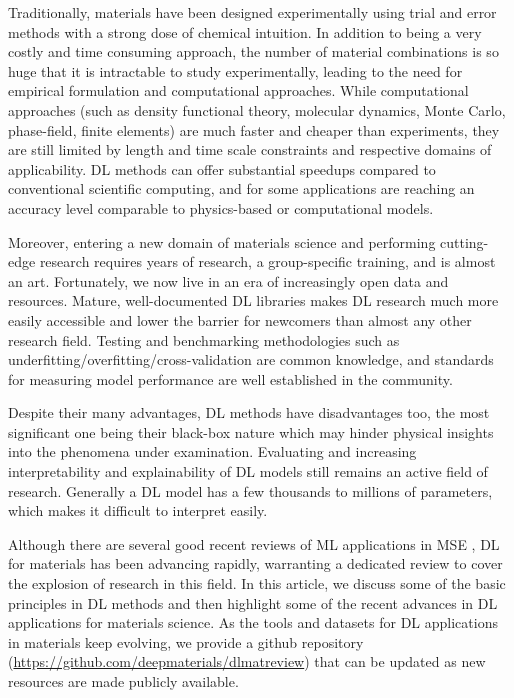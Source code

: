 \documentclass[pdflatex,sn-mathphys]{sn-jnl}%
\theoremstyle{thmstyleone}%
\theoremstyle{thmstyletwo}%
\theoremstyle{thmstylethree}%
\begin{document}
Traditionally, materials have been designed experimentally using trial and error methods with a strong dose of chemical intuition. In addition to being a very costly and time consuming approach, the number of material combinations is so huge that it is intractable to study experimentally, leading to the need for empirical formulation and computational approaches. While computational approaches (such as density functional theory, molecular dynamics, Monte Carlo, phase-field,  finite elements) are much faster and cheaper than experiments, they are still limited by length and time scale constraints and respective domains of applicability. DL methods can offer substantial speedups compared to conventional scientific computing, and for some applications are reaching an accuracy level comparable to physics-based or computational models.

Moreover, entering a new domain of materials science and performing cutting-edge research requires years of research, a group-specific training, and is almost an art. Fortunately, we now live in an era of increasingly open data and resources. Mature, well-documented DL libraries makes DL research much more easily accessible and lower the barrier for newcomers than almost any other research field. Testing and benchmarking methodologies such as underfitting/overfitting/cross-validation \cite{vasudevan2019materials,schmidt2019recent,artrith2021best} are common knowledge, and standards for measuring model performance are well established in the community.
 
Despite their many advantages, DL methods have disadvantages too, the most significant one being their black-box nature which may hinder physical insights into the phenomena under examination. Evaluating and increasing  interpretability and explainability of DL models still remains an active field of research. Generally a DL model has a few thousands to millions of parameters, which makes it difficult to interpret easily.

Although there are several good recent reviews of ML applications in MSE \cite{vasudevan2019materials,schleder2019dft,schmidt2019recent,mueller2016machine,wei2019machine,butler2018machine,liu2020machine,wang2020machine,morgan2020opportunities,himanen2019data,rajan2013informatics,montans2019data,aykol2019materials}, DL for materials has been advancing rapidly, warranting a dedicated review to cover the explosion of research in this field. In this article, we discuss some of the basic principles in DL methods and then highlight some of the recent advances in DL applications for materials science. As the tools and datasets for DL applications in materials keep evolving, we provide a github repository (\url{https://github.com/deepmaterials/dlmatreview}) that can be updated as new resources are made publicly available.  
\end{document}
